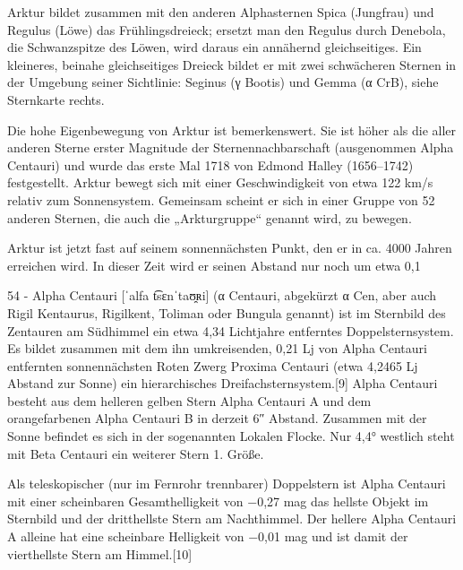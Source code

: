 Arktur bildet zusammen mit den anderen Alphasternen Spica (Jungfrau) und Regulus (Löwe) das Frühlingsdreieck; ersetzt man den Regulus durch Denebola, die Schwanzspitze des Löwen, wird daraus ein annähernd gleichseitiges. Ein kleineres, beinahe gleichseitiges Dreieck bildet er mit zwei schwächeren Sternen in der Umgebung seiner Sichtlinie: Seginus (γ Bootis) und Gemma (α CrB), siehe Sternkarte rechts. 

Die hohe Eigenbewegung von Arktur ist bemerkenswert. Sie ist höher als die aller anderen Sterne erster Magnitude der Sternennachbarschaft (ausgenommen Alpha Centauri) und wurde das erste Mal 1718 von Edmond Halley (1656–1742) festgestellt. Arktur bewegt sich mit einer Geschwindigkeit von etwa 122 km/s relativ zum Sonnensystem. Gemeinsam scheint er sich in einer Gruppe von 52 anderen Sternen, die auch die „Arkturgruppe“ genannt wird, zu bewegen.

Arktur ist jetzt fast auf seinem sonnennächsten Punkt, den er in ca. 4000 Jahren erreichen wird. In dieser Zeit wird er seinen Abstand nur noch um etwa 0,1 %



54 - Alpha Centauri [ˈalfa t͡sɛnˈtaʊ̯ʀi] (α Centauri, abgekürzt α Cen, aber auch Rigil Kentaurus, Rigilkent, Toliman oder Bungula genannt) ist im Sternbild des Zentauren am Südhimmel ein etwa 4,34 Lichtjahre entferntes Doppelsternsystem. Es bildet zusammen mit dem ihn umkreisenden, 0,21 Lj von Alpha Centauri entfernten sonnennächsten Roten Zwerg Proxima Centauri (etwa 4,2465 Lj Abstand zur Sonne) ein hierarchisches Dreifachsternsystem.[9] Alpha Centauri besteht aus dem helleren gelben Stern Alpha Centauri A und dem orangefarbenen Alpha Centauri B in derzeit 6″ Abstand. Zusammen mit der Sonne befindet es sich in der sogenannten Lokalen Flocke. Nur 4,4° westlich steht mit Beta Centauri ein weiterer Stern 1. Größe.

Als teleskopischer (nur im Fernrohr trennbarer) Doppelstern ist Alpha Centauri mit einer scheinbaren Gesamthelligkeit von −0,27 mag das hellste Objekt im Sternbild und der dritthellste Stern am Nachthimmel. Der hellere Alpha Centauri A alleine hat eine scheinbare Helligkeit von −0,01 mag und ist damit der vierthellste Stern am Himmel.[10] 



